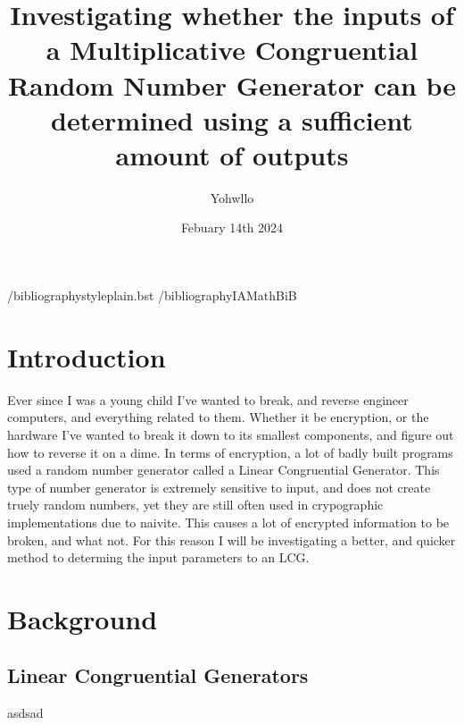 \documentclass{article}
\begin{document}
\title{Investigating whether the inputs of a Multiplicative Congruential Random Number Generator can be determined using a sufficient amount of outputs}
\author{Yohwllo}
\date{Febuary 14th 2024}

\maketitle


/bibliographystyle{plain.bst}
/bibliography{IAMathBiB}



\pagebreak
\tableofcontents

\pagebreak
\begin{multicols}{2}
\section{Introduction}
Ever since I was a young child I've wanted to break, and reverse engineer computers, and everything related to them. Whether it be encryption, or the hardware I've wanted to break it down to its smallest components, and figure out how to reverse it on a dime. In terms of encryption, a lot of badly built programs used a random number generator called a Linear Congruential Generator. This type of number generator is extremely sensitive to input, and does not create truely random numbers, yet they are still often used in crypographic implementations due to naivite. This causes a lot of encrypted information to be broken, and what not. For this reason I will be investigating a better, and quicker method to determing the input parameters to an LCG.

\section{Background}
\subsection{Linear Congruential Generators}
asdsad
\cite[]{guglani2008transient}


\end{multicols}
\end{document}
